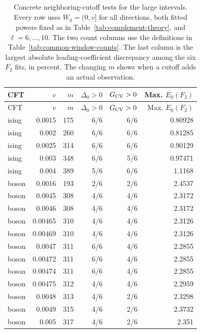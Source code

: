 \begingroup\setlength{\tabcolsep}{4pt}
\begin{longtable}{lrrrrr}
\caption{Concrete neighboring-cutoff tests for the large intervals. Every row uses $W_y=(0,v]$ for all directions, both fitted powers fixed as in Table~\ref{tab:complement-theory}, and $\ell=6,\ldots,10$. The two count columns use the definitions in Table~\ref{tab:common-window-counts}. The last column is the largest absolute leading-coefficient discrepancy among the six $F_2$ fits, in percent. The changing $m$ shows when a cutoff adds an actual observation.}
\label{tab:common-window-neighbors}\\\toprule
CFT & $v$ & $m$ & $\Delta_0>0$ & $G_{\rm CV}>0$ & Max. $E_0(F_2)$\\\midrule
\endfirsthead
\toprule
CFT & $v$ & $m$ & $\Delta_0>0$ & $G_{\rm CV}>0$ & Max. $E_0(F_2)$\\\midrule
\endhead
\bottomrule\endfoot
ising & 0.0015 & 175 & 6/6 & 6/6 & 0.80928\\
ising & 0.002 & 260 & 6/6 & 6/6 & 0.81285\\
ising & 0.0025 & 314 & 6/6 & 6/6 & 0.90129\\
ising & 0.003 & 348 & 6/6 & 5/6 & 0.97471\\
ising & 0.004 & 389 & 5/6 & 6/6 & 1.1168\\
boson & 0.0016 & 193 & 2/6 & 2/6 & 2.4537\\
boson & 0.0045 & 308 & 4/6 & 4/6 & 2.3172\\
boson & 0.0046 & 308 & 4/6 & 4/6 & 2.3172\\
boson & 0.00465 & 310 & 4/6 & 4/6 & 2.3126\\
boson & 0.00469 & 310 & 4/6 & 4/6 & 2.3126\\
boson & 0.0047 & 311 & 6/6 & 4/6 & 2.2855\\
boson & 0.00472 & 311 & 6/6 & 4/6 & 2.2855\\
boson & 0.00474 & 311 & 6/6 & 4/6 & 2.2855\\
boson & 0.00475 & 312 & 4/6 & 4/6 & 2.2959\\
boson & 0.0048 & 313 & 4/6 & 2/6 & 2.3298\\
boson & 0.0049 & 315 & 4/6 & 2/6 & 2.3732\\
boson & 0.005 & 317 & 4/6 & 2/6 & 2.351\\
\end{longtable}
\endgroup
